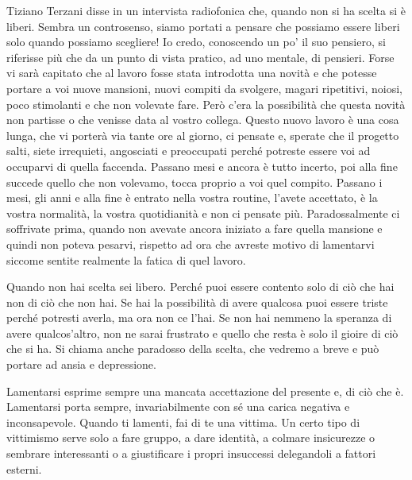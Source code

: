 \documentclass[12pt]{book} %
\begin{document}
Tiziano Terzani disse in un intervista radiofonica che, quando non si ha scelta si è liberi. Sembra un controsenso,
siamo portati a pensare che possiamo essere liberi solo quando possiamo scegliere! Io credo, conoscendo un
po' il suo pensiero, si riferisse più che da un punto di vista pratico, ad uno mentale, di
pensieri. Forse vi sarà capitato che al lavoro fosse stata introdotta una novità e che potesse portare a voi nuove
mansioni, nuovi compiti da svolgere, magari ripetitivi, noiosi, poco stimolanti e che non volevate fare. Però
c'era la possibilità che questa novità non partisse o che venisse data al vostro collega. Questo
nuovo lavoro è una cosa lunga, che vi porterà via tante ore al giorno, ci pensate e, sperate che il progetto salti,
siete irrequieti, angosciati e preoccupati perché potreste essere voi ad occuparvi di quella faccenda. Passano mesi e
ancora è tutto incerto, poi alla fine succede quello che non volevamo, tocca proprio a voi quel compito. Passano i
mesi, gli anni e alla fine è entrato nella vostra routine, l'avete accettato, è la vostra
normalità, la vostra quotidianità e non ci pensate più. Paradossalmente ci soffrivate prima, quando non avevate ancora
iniziato a fare quella mansione e quindi non poteva pesarvi, rispetto ad ora che avreste motivo di lamentarvi siccome
sentite realmente la fatica di quel lavoro.

Quando non hai scelta sei libero. Perché puoi essere contento solo di ciò che hai non di ciò che non hai. Se hai la
possibilità di avere qualcosa puoi essere triste perché potresti averla, ma ora non ce l'hai. Se
non hai nemmeno la speranza di avere qualcos'altro, non ne sarai frustrato e quello che resta è solo il gioire di ciò
che si ha. Si chiama anche paradosso della scelta, che vedremo a breve e può portare ad ansia e depressione.

Lamentarsi esprime sempre una mancata accettazione del presente e, di ciò che è. Lamentarsi porta sempre,
invariabilmente con sé una carica negativa e inconsapevole. Quando ti lamenti, fai di te una vittima. Un certo tipo di
vittimismo serve solo a fare gruppo, a dare identità, a colmare insicurezze o sembrare interessanti o a giustificare i
propri insuccessi delegandoli a fattori esterni.
\end{document}
